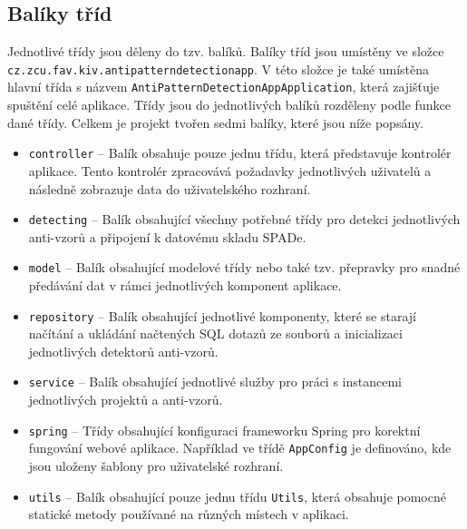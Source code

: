 \documentclass[czech,DP]{thesiskiv}
\begin{document}
\subsection{Balíky tříd}
Jednotlivé třídy jsou děleny do tzv. balíků. Balíky tříd jsou umístěny ve složce \texttt{cz.zcu.fav.kiv.antipatterndetectionapp}. V této složce je také umístěna hlavní třída s názvem \texttt{AntiPatternDetectionAppApplication}, která zajišťuje spuštění celé aplikace. Třídy jsou do jednotlivých balíků rozděleny podle funkce dané třídy. Celkem je projekt tvořen sedmi balíky, které jsou níže popsány.
\begin{itemize}
    \item \texttt{controller} -- Balík obsahuje pouze jednu třídu, která představuje kontrolér aplikace. Tento kontrolér zpracovává požadavky jednotlivých uživatelů a následně zobrazuje data do uživatelského rozhraní.
    \item \texttt{detecting} -- Balík obsahující všechny potřebné třídy pro detekci jednotlivých anti-vzorů a připojení k datovému skladu SPADe.
    \item \texttt{model} -- Balík obsahující modelové třídy nebo také tzv. přepravky pro snadné předávání dat v rámci jednotlivých komponent aplikace.
    \item \texttt{repository} -- Balík obsahující jednotlivé komponenty, které se starají načítání a ukládání načtených SQL dotazů ze souborů a inicializaci jednotlivých detektorů anti-vzorů.
    \item \texttt{service} -- Balík obsahující jednotlivé služby pro práci s instancemi jednotlivých projektů a anti-vzorů.
    \item \texttt{spring} -- Třídy obsahující konfiguraci frameworku Spring pro korektní fungování webové aplikace. Například ve třídě \texttt{AppConfig} je definováno, kde jsou uloženy šablony pro uživatelské rozhraní.
    \item \texttt{utils} -- Balík obsahující pouze jednu třídu \texttt{Utils}, která obsahuje pomocné statické metody používané na různých místech v aplikaci.
\end{itemize}
\end{document}
